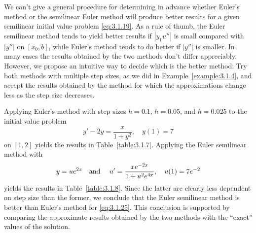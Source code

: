 We can't give a general procedure for determining in advance whether Euler's method or the
semilinear Euler method will produce better results for a given semilinear initial value problem
\eqref{eq:3.1.19}. As a rule of thumb, the Euler semilinear method tends to yield better results
if $|y_{1}u''|$ is small compared with $|y''|$ on $[x_{0},b]$, while Euler's method tends to do
better if $|y''|$ is smaller. In many cases the results obtained by the two methods don't differ
appreciably. However, we propose an intuitive way to decide which is the better method: Try both
methods with multiple step sizes, as we did in Example~\ref{example:3.1.4}, and accept the results
obtained by the method for which the approximations change less as the step size decreases.

\begin{example}
  \label{example:3.1.5} \rm Applying Euler's method with step sizes $h=0.1$, $h=0.05$, and $h=0.025$
  to the initial value problem
  \begin{equation}
    \label{eq:3.1.25}y'-2y=\frac{x}{1+y^{2}},\quad y(1)=7
  \end{equation}
  on $[1,2]$ yields the results in Table~\ref{table:3.1.7}. Applying the Euler semilinear method
  with
  \[
    y=ue^{2x}\mbox{\quad and \quad}u'=\frac{xe^{-2x}}{1+u^{2}e^{4x}},\quad u(1)=7e^{-2}
  \]
  yields the results in Table~\ref{table:3.1.8}. Since the latter are clearly less dependent on step
  size than the former, we conclude that the Euler semilinear method is better than Euler's method
  for \eqref{eq:3.1.25}. This conclusion is supported by comparing the approximate results obtained
  by the two methods with the ``exact'' values of the solution.
\end{example}

